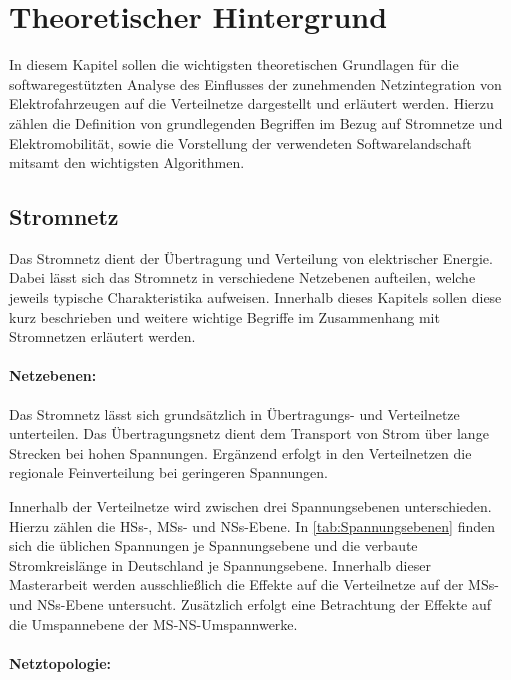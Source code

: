 \section{Theoretischer Hintergrund}

In diesem Kapitel sollen die wichtigsten theoretischen Grundlagen für die softwaregestützten Analyse des Einflusses der zunehmenden Netzintegration von Elektrofahrzeugen auf die Verteilnetze dargestellt und erläutert werden.
Hierzu zählen die Definition von grundlegenden Begriffen im Bezug auf Stromnetze und Elektromobilität, sowie die Vorstellung der verwendeten Softwarelandschaft mitsamt den wichtigsten Algorithmen.


\subsection{Stromnetz}

Das Stromnetz dient der Übertragung und Verteilung von elektrischer Energie. \cite{Paschotta2020}
Dabei lässt sich das Stromnetz in verschiedene Netzebenen aufteilen, welche jeweils typische Charakteristika aufweisen.
Innerhalb dieses Kapitels sollen diese kurz beschrieben und weitere wichtige Begriffe im Zusammenhang mit Stromnetzen erläutert werden.


\paragraph{Netzebenen:}

Das Stromnetz lässt sich grundsätzlich in Übertragungs- und Verteilnetze unterteilen.
Das Übertragungsnetz dient dem Transport von Strom über lange Strecken bei hohen Spannungen.
Ergänzend erfolgt in den Verteilnetzen die regionale Feinverteilung bei geringeren Spannungen. \cite{Agora2019}\medskip

Innerhalb der Verteilnetze wird zwischen drei Spannungsebenen unterschieden. Hierzu zählen die \glspl{HS}-, \glspl{MS}- und \glspl{NS}-Ebene.
In \autoref{tab:Spannungsebenen} finden sich die üblichen Spannungen je Spannungsebene und die verbaute Stromkreislänge in Deutschland je Spannungsebene.
Innerhalb dieser Masterarbeit werden ausschließlich die Effekte auf die Verteilnetze auf der \glspl{MS}- und \glspl{NS}-Ebene untersucht.
Zusätzlich erfolgt eine Betrachtung der Effekte auf die Umspannebene der \gls{MS}-\gls{NS}-Umspannwerke.




\paragraph{Netztopologie:}

